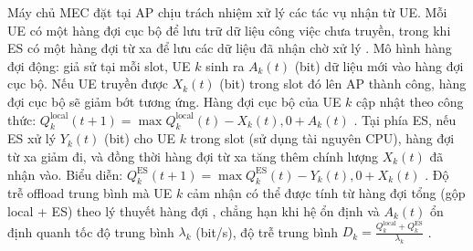  Máy chủ MEC đặt tại AP chịu trách nhiệm xử lý các tác vụ nhận từ UE. Mỗi UE có một hàng đợi cục bộ để lưu trữ dữ liệu công việc chưa truyền, trong khi ES có một hàng đợi từ xa để lưu các dữ liệu đã nhận chờ xử lý
. Mô hình hàng đợi động: giả sử tại mỗi slot, UE $k$ sinh ra $A_k(t)$ (bit) dữ liệu mới vào hàng đợi cục bộ. Nếu UE truyền được $X_k(t)$ (bit) trong slot đó lên AP thành công, hàng đợi cục bộ sẽ giảm bớt tương ứng. Hàng đợi cục bộ của UE $k$ cập nhật theo công thức: $Q_k^\text{local}(t+1) = \max{Q_k^\text{local}(t) - X_k(t), 0} + A_k(t)$
\cite{ris_latency}
. Tại phía ES, nếu ES xử lý $Y_k(t)$ (bit) cho UE $k$ trong slot (sử dụng tài nguyên CPU), hàng đợi từ xa giảm đi, và đồng thời hàng đợi từ xa tăng thêm chính lượng $X_k(t)$ đã nhận vào. Biểu diễn: $Q_k^\text{ES}(t+1) = \max{Q_k^\text{ES}(t) - Y_k(t), 0} + X_k(t)$
. Độ trễ offload trung bình mà UE $k$ cảm nhận có thể được tính từ hàng đợi tổng (gộp local + ES) theo lý thuyết hàng đợi
, chẳng hạn khi hệ ổn định và $A_k(t)$ ổn định quanh tốc độ trung bình $\lambda_k$ (bit/s), độ trễ trung bình $D_k = \frac{Q_k^\text{local} + Q_k^\text{ES}}{\lambda_k}$
\cite{ris_latency}
.



